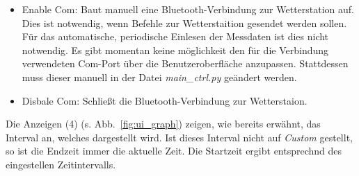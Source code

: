 \begin{itemize}
\begin{itemize}
  \item Enable Com: Baut manuell eine Bluetooth-Verbindung zur Wetterstation auf. Dies ist notwendig, wenn Befehle zur Wetterstaition gesendet werden sollen. Für das automatische, periodische Einlesen der Messdaten ist dies nicht notwendig. Es gibt momentan keine möglichkeit den für die Verbindung verwendeten Com-Port über die Benutzeroberfläche anzupassen. Stattdessen muss dieser manuell in der Datei \emph{main\_ctrl.py} geändert werden.
  \item Disbale Com: Schließt die Bluetooth-Verbindung zur Wetterstaion.
  \end{itemize}
\end{itemize}

Die Anzeigen (4) (s. Abb.~\ref{fig:ui_graph}) zeigen, wie bereits erwähnt, das Interval an, welches dargestellt wird. Ist dieses Interval nicht auf \emph{Custom} gestellt, so ist die Endzeit immer die aktuelle Zeit. Die Startzeit ergibt entsprechnd des eingestellen Zeitintervalls.

